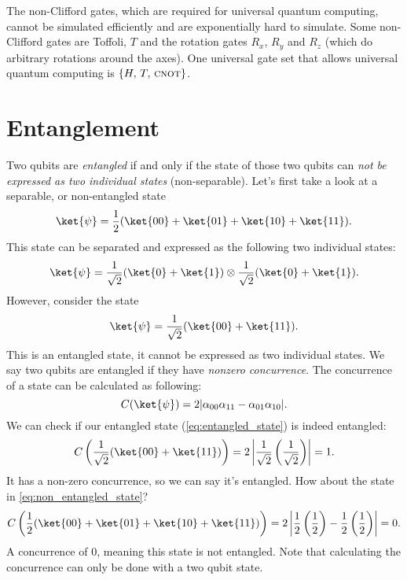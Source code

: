 The non-Clifford gates, which are required for universal quantum computing, cannot be simulated efficiently and are exponentially hard to simulate. Some non-Clifford gates are Toffoli, $T$ and the rotation gates $R_x$, $R_y$ and $R_z$ (which do arbitrary rotations around the axes). One universal gate set that allows universal quantum computing is $\{H,\, T,\, \textsc{cnot}\}$.

\section{Entanglement}
Two qubits are \emph{entangled} if and only if the state of those two qubits can \emph{not be expressed as two individual states} (non-separable). Let's first take a look at a separable, or non-entangled state
\begin{equation} \label{eq:non_entangled_state}
  \ket{\psi} = \dfrac{1}{2}(\ket{00} + \ket{01} + \ket{10} + \ket{11}).
\end{equation}
This state can be separated and expressed as the following two individual states:
\begin{equation}
  \ket{\psi} = \dfrac{1}{\sqrt2}(\ket{0} + \ket{1}) \otimes \dfrac{1}{\sqrt2}(\ket{0} + \ket{1}).
\end{equation}
However, consider the state
\begin{equation} \label{eq:entangled_state}
  \ket{\psi} = \dfrac{1}{\sqrt2}(\ket{00} + \ket{11}).
\end{equation}
This is an entangled state, it cannot be expressed as two individual states. We say two qubits are entangled if they have \emph{nonzero concurrence}. The concurrence of a state can be calculated as following:
\begin{equation}
  C(\ket{\psi}) = 2|\alpha_{00}\alpha_{11} - \alpha_{01}\alpha_{10}|.
\end{equation}
We can check if our entangled state (\ref{eq:entangled_state}) is indeed entangled:
\begin{equation}
  C\left(\dfrac{1}{\sqrt2}(\ket{00} + \ket{11})\right) = 2\left|\dfrac{1}{\sqrt2}\left(\dfrac{1}{\sqrt2}\right)\right| = 1.
\end{equation}
It has a non-zero concurrence, so we can say it's entangled. How about the state in \ref{eq:non_entangled_state}?
\begin{equation}
  C\left(\dfrac{1}{2}(\ket{00} + \ket{01} + \ket{10} + \ket{11})\right) = 2\left|\dfrac{1}{2}\left(\dfrac{1}{2}\right) - \dfrac{1}{2}\left(\dfrac{1}{2}\right)\right| = 0.
\end{equation}
A concurrence of 0, meaning this state is not entangled. Note that calculating the concurrence can only be done with a two qubit state.

